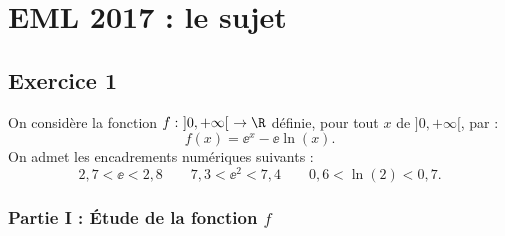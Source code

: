 \chapter*{EML 2017 : le sujet}
  
%

\section*{Exercice 1}
\noindent
On considère la fonction $f : \ ]0,+\infty[ \ \rightarrow \R$ définie,
pour tout $x$ de $]0,+\infty[$, par :
\[
f(x)=\ee^x-\ee \ln(x).
\]
On admet les encadrements numériques suivants :
\[
2,7<\ee<2,8 \qquad 7,3<\ee^2<7,4 \qquad 0,6<\ln(2)<0,7.
\]

\subsection*{Partie I : Étude de la fonction $f$}


